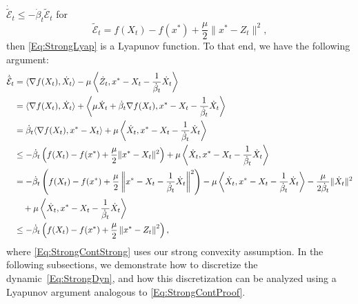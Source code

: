 \documentclass[11pt]{article}
\theoremstyle{plain}
\newcommand{\E}{{\mathcal E}}
\begin{document}
$\dot{\tilde{\E}}_t \leq - \dot \beta_t \tilde{\E}_t$
for 
\begin{equation}\label{Eq:StrongLyap2}
\tilde \E_t = f(X_t) - f(x^\ast) + \frac{\mu}{2}\|x^\ast - Z_t \|^2,
\end{equation}
then \eqref{Eq:StrongLyap} is a Lyapunov function. To that end, we have the following argument:
\begin{subequations}\label{Eq:StrongContProof}
\begin{align}
\dot {\tilde{\E}}_t  &= \langle \nabla f(X_t), \dot X_t\rangle - \mu\left\langle \dot Z_t, x^\ast - X_t -\frac{1}{\dot \beta_t}  \dot X_t\right\rangle \notag\\
& = \langle \nabla f(X_t), \dot X_t\rangle +  \left\langle\mu \dot X_t +  \dot \beta_t \nabla f(X_t),x^\ast - X_t -\frac{1}{\dot \beta_t}  \dot X_t\right\rangle \notag\\
& = \dot \beta_t \langle  \nabla f(X_t),x^\ast - X_t\rangle +    \mu\left\langle  \dot X_t, x^\ast - X_t- \frac{1}{\dot \beta_t}  \dot X_t\right\rangle \notag\\
& \leq - \dot \beta_t \left(f(X_t) - f(x^\ast) + \frac{\mu}{2}\|x^\ast - X_t\|^2\right)+   \mu \left\langle  \dot X_t, x^\ast - X_t- \frac{1}{\dot \beta_t}  \dot X_t\right\rangle\label{Eq:StrongContStrong}\\
& =  - \dot \beta_t \left(f(X_t) - f(x^\ast) + \frac{\mu}{2}\left\|x^\ast - X_t - \frac{1}{\dot \beta_t} \dot X_t\right\|^2\right) -\mu\left\langle \dot X_t, x^\ast - X_t - \frac{1}{\dot \beta_t} \dot X_t\right\rangle- \frac{\mu}{2\dot \beta_t}\|\dot X_t\|^2\notag \\
&\quad + \mu \left\langle \dot X_t,x^\ast - X_t- \frac{1}{\dot \beta_t}  \dot X_t\right\rangle\notag\\
& \leq   - \dot \beta_t \left(f(X_t) - f(x^\ast) + \frac{\mu}{2}\left\|x^\ast - Z_t\right\|^2\right) \notag,
\end{align}
\end{subequations}
where \eqref{Eq:StrongContStrong} uses our strong convexity assumption. In the following subsections, we demonstrate how to discretize the dynamic~\eqref{Eq:StrongDyn}, and how this discretization can be analyzed using a Lyapunov argument analogous to \eqref{Eq:StrongContProof}.
%
%
%
%
\end{document}
